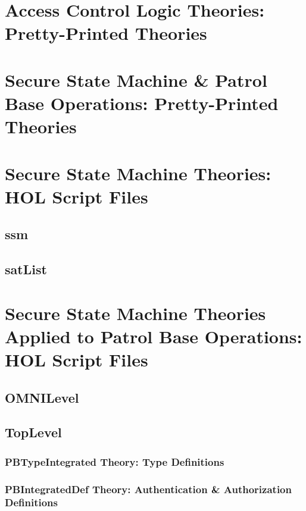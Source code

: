 \documentclass[hidelinks,12pt,a4paper]{report}
\begin{document}
\begin{appendices}
\chapter{Access Control Logic Theories: Pretty-Printed Theories}


\chapter{Secure State Machine \& Patrol Base Operations: Pretty-Printed Theories }


\chapter{Secure State Machine Theories: HOL Script Files}
\section{ssm}

\section{satList}



\chapter{Secure State Machine Theories Applied to Patrol Base Operations: HOL Script Files}
\section{OMNILevel}


\section{TopLevel}
\subsection{PBTypeIntegrated Theory: Type Definitions}

\subsection{PBIntegratedDef Theory: Authentication \& Authorization Definitions}


\end{appendices}
\end{document}

